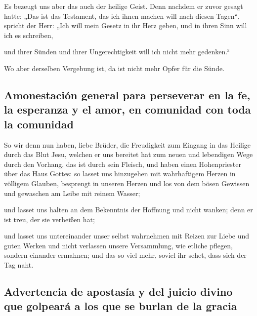  Es bezeugt uns aber das auch der heilige Geist. Denn
nachdem er zuvor gesagt hatte:  „Das ist das Testament,
das ich ihnen machen will nach diesen Tagen``, spricht der Herr: „Ich
will mein Gesetz in ihr Herz geben, und in ihren Sinn will ich es
schreiben,

 und ihrer Sünden und ihrer Ungerechtigkeit will ich
nicht mehr gedenken.``

 Wo aber derselben Vergebung ist, da ist nicht mehr Opfer
für die Sünde.

\hypertarget{amonestaciuxf3n-general-para-perseverar-en-la-fe-la-esperanza-y-el-amor-en-comunidad-con-toda-la-comunidad}{%
\subsection{Amonestación general para perseverar en la fe, la esperanza
y el amor, en comunidad con toda la
comunidad}\label{amonestaciuxf3n-general-para-perseverar-en-la-fe-la-esperanza-y-el-amor-en-comunidad-con-toda-la-comunidad}}

 So wir denn nun haben, liebe Brüder, die Freudigkeit zum
Eingang in das Heilige durch das Blut Jesu,  welchen er
uns bereitet hat zum neuen und lebendigen Wege durch den Vorhang, das
ist durch sein Fleisch,  und haben einen Hohenpriester
über das Haus Gottes:  so lasset uns hinzugehen mit
wahrhaftigem Herzen in völligem Glauben, besprengt in unseren Herzen und
los von dem bösen Gewissen und gewaschen am Leibe mit reinem Wasser;

 und lasset uns halten an dem Bekenntnis der Hoffnung und
nicht wanken; denn er ist treu, der sie verheißen hat;

 und lasset uns untereinander unser selbst wahrnehmen mit
Reizen zur Liebe und guten Werken  und nicht verlassen
unsere Versammlung, wie etliche pflegen, sondern einander ermahnen; und
das so viel mehr, soviel ihr sehet, dass sich der Tag naht.

\hypertarget{advertencia-de-apostasuxeda-y-del-juicio-divino-que-golpearuxe1-a-los-que-se-burlan-de-la-gracia}{%
\subsection{Advertencia de apostasía y del juicio divino que golpeará a
los que se burlan de la
gracia}\label{advertencia-de-apostasuxeda-y-del-juicio-divino-que-golpearuxe1-a-los-que-se-burlan-de-la-gracia}}

